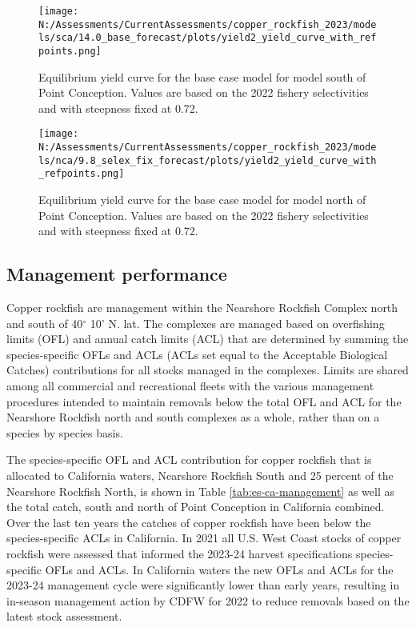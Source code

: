 \documentclass[11pt,
  english,
  letterpaper,
]{article}
\begin{document}
\begin{figure}
\centering
\texttt{[image: N:/Assessments/CurrentAssessments/copper\_rockfish\_2023/models/sca/14.0\_base\_forecast/plots/yield2\_yield\_curve\_with\_refpoints.png]}
\caption{Equilibrium yield curve for the base case model for model south of Point Conception. Values are based on the 2022 fishery selectivities and with steepness fixed at 0.72.\label{fig:south-es-yield}}
\end{figure}

\begin{figure}
\centering
\texttt{[image: N:/Assessments/CurrentAssessments/copper\_rockfish\_2023/models/nca/9.8\_selex\_fix\_forecast/plots/yield2\_yield\_curve\_with\_refpoints.png]}
\caption{Equilibrium yield curve for the base case model for model north of Point Conception. Values are based on the 2022 fishery selectivities and with steepness fixed at 0.72.\label{fig:north-es-yield}}
\end{figure}

\pagebreak

\hypertarget{management-performance}{%
\subsection*{Management performance}\label{management-performance}}

Copper rockfish are management within the Nearshore Rockfish Complex north and south of 40\(^\circ\) 10' N. lat. The complexes are managed based on overfishing limits (OFL) and annual catch limits (ACL) that are determined by summing the species-specific OFLs and ACLs (ACLs set equal to the Acceptable Biological Catches) contributions for all stocks managed in the complexes. Limits are shared among all commercial and recreational fleets with the various management procedures intended to maintain removals below the total OFL and ACL for the Nearshore Rockfish north and south complexes as a whole, rather than on a species by species basis.

The species-specific OFL and ACL contribution for copper rockfish that is allocated to California waters, Nearshore Rockfish South and 25 percent of the Nearshore Rockfish North, is shown in Table \ref{tab:es-ca-management} as well as the total catch, south and north of Point Conception in California combined. Over the last ten years the catches of copper rockfish have been below the species-specific ACLs in California. In 2021 all U.S. West Coast stocks of copper rockfish were assessed that informed the 2023-24 harvest specifications species-specific OFLs and ACLs. In California waters the new OFLs and ACLs for the 2023-24 management cycle were significantly lower than early years, resulting in in-season management action by CDFW for 2022 to reduce removals based on the latest stock assessment.
\end{document}

